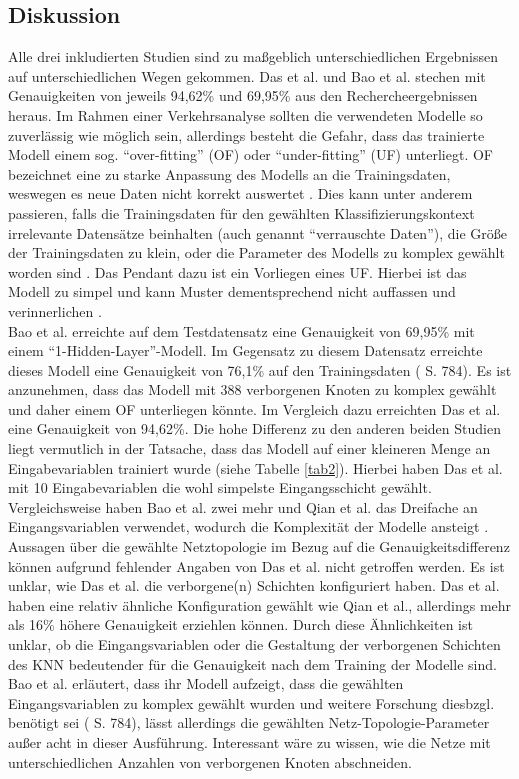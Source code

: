 \documentclass{scrartcl}
\begin{document}
\subsection{Diskussion}

Alle drei inkludierten Studien sind zu maßgeblich unterschiedlichen Ergebnissen
auf unterschiedlichen Wegen gekommen. Das et al. und Bao et al. stechen
mit Genauigkeiten von jeweils 94,62\% und 69,95\% aus den Rechercheergebnissen
heraus. Im Rahmen einer Verkehrsanalyse sollten die verwendeten Modelle so
zuverlässig wie möglich sein, allerdings besteht die Gefahr, dass das trainierte
Modell einem sog. \enquote{over-fitting} (OF) oder \enquote{under-fitting} (UF)
unterliegt. OF bezeichnet eine zu starke Anpassung des Modells an die Trainingsdaten,
weswegen es neue Daten nicht korrekt auswertet \cite{aws}.
Dies kann unter anderem passieren, falls die Trainingsdaten für den gewählten
Klassifizierungskontext irrelevante Datensätze beinhalten
(auch genannt \enquote{verrauschte Daten}), die Größe der Trainingsdaten
zu klein, oder die Parameter des Modells zu komplex
gewählt worden sind \cite{aws}. Das Pendant dazu ist ein Vorliegen eines UF.
Hierbei ist das Modell zu simpel und kann Muster dementsprechend nicht auffassen
und verinnerlichen \cite{ibm2}.
\medskip \\
Bao et al. erreichte auf dem Testdatensatz eine Genauigkeit von 69,95\% mit
einem \enquote{1-Hidden-Layer}-Modell. Im Gegensatz zu diesem Datensatz
erreichte dieses Modell
eine Genauigkeit von 76,1\% auf den Trainingsdaten (\cite{bao} S. 784).
Es ist anzunehmen, dass das Modell mit 388 verborgenen Knoten zu
komplex gewählt und daher einem OF unterliegen könnte.
Im Vergleich dazu erreichten Das et al. eine Genauigkeit von 94,62\%.
Die hohe Differenz zu den anderen beiden Studien liegt vermutlich in der Tatsache,
dass das Modell auf einer kleineren Menge an Eingabevariablen trainiert wurde
(siehe Tabelle \ref{tab2}). Hierbei haben Das et al. mit 10 Eingabevariablen
die wohl simpelste Eingangsschicht gewählt. Vergleichsweise haben Bao et al. zwei mehr und
Qian et al. das Dreifache an Eingangsvariablen verwendet, wodurch die Komplexität der
Modelle ansteigt \cite{aws}.
\medskip \\
Aussagen über die gewählte Netztopologie im Bezug auf die Genauigkeitsdifferenz
können aufgrund fehlender Angaben von Das et al. nicht getroffen werden. Es ist unklar,
wie Das et al. die verborgene(n) Schichten konfiguriert haben.
Das et al. haben eine relativ ähnliche Konfiguration gewählt wie Qian et al., allerdings
mehr als 16\% höhere Genauigkeit erziehlen können.
Durch diese Ähnlichkeiten ist unklar, ob die Eingangsvariablen
oder die Gestaltung der verborgenen Schichten des KNN bedeutender für die Genauigkeit nach
dem Training der Modelle sind.
\medskip \\
Bao et al. erläutert, dass ihr Modell aufzeigt, dass die gewählten Eingangsvariablen zu
komplex gewählt wurden und weitere Forschung diesbzgl. benötigt sei (\cite{bao} S. 784), lässt allerdings die
gewählten Netz-Topologie-Parameter außer acht in dieser Ausführung. Interessant wäre zu wissen,
wie die Netze mit unterschiedlichen Anzahlen von verborgenen Knoten abschneiden.
\end{document}
